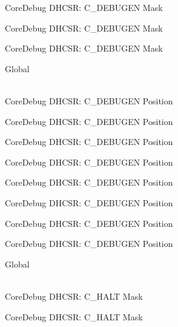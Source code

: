 \begin{DoxyRefList}
\label{deprecated__deprecated000402}%
%
Core\+Debug DHCSR\+: C\+\_\+\+DEBUGEN Mask 

\label{deprecated__deprecated000491}%
%
Core\+Debug DHCSR\+: C\+\_\+\+DEBUGEN Mask 

\label{deprecated__deprecated000593}%
%
Core\+Debug DHCSR\+: C\+\_\+\+DEBUGEN Mask  
\item[{\parbox[t]{\linewidth}{Global \doxylink{group___c_m_s_i_s___core_debug_gab557abb5b172b74d2cf44efb9d824e4e}{Core\+Debug\+\_\+\+DHCSR\+\_\+\+C\+\_\+\+DEBUGEN\+\_\+\+Pos} }}]\hfill \\
\label{deprecated__deprecated000039}%
%
Core\+Debug DHCSR\+: C\+\_\+\+DEBUGEN Position 

\label{deprecated__deprecated000127}%
%
Core\+Debug DHCSR\+: C\+\_\+\+DEBUGEN Position 

\label{deprecated__deprecated000183}%
%
Core\+Debug DHCSR\+: C\+\_\+\+DEBUGEN Position 

\label{deprecated__deprecated000266}%
%
Core\+Debug DHCSR\+: C\+\_\+\+DEBUGEN Position 

\label{deprecated__deprecated000325}%
%
Core\+Debug DHCSR\+: C\+\_\+\+DEBUGEN Position 

\label{deprecated__deprecated000401}%
%
Core\+Debug DHCSR\+: C\+\_\+\+DEBUGEN Position 

\label{deprecated__deprecated000490}%
%
Core\+Debug DHCSR\+: C\+\_\+\+DEBUGEN Position 

\label{deprecated__deprecated000592}%
%
Core\+Debug DHCSR\+: C\+\_\+\+DEBUGEN Position  
\item[{\parbox[t]{\linewidth}{Global \doxylink{group___c_m_s_i_s___core_debug_ga1d905a3aa594eb2e8bb78bcc4da05b3f}{Core\+Debug\+\_\+\+DHCSR\+\_\+\+C\+\_\+\+HALT\+\_\+\+Msk} }}]\hfill \\
\label{deprecated__deprecated000038}%
%
Core\+Debug DHCSR\+: C\+\_\+\+HALT Mask 

\label{deprecated__deprecated000126}%
%
Core\+Debug DHCSR\+: C\+\_\+\+HALT Mask 


\end{DoxyRefList}
